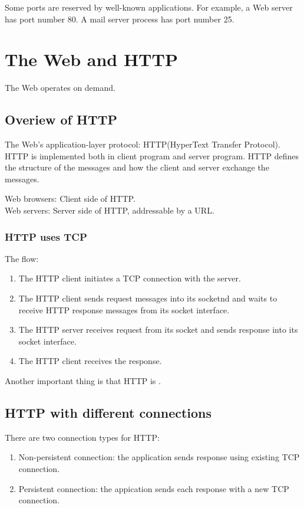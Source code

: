 Some ports are reserved by well-known applications. For example, a Web server has port number 80. A mail server process has port number 25.



\section{The Web and HTTP}
The Web operates on demand.
\subsection{Overiew of HTTP}

The Web's application-layer protocol: HTTP(HyperText Transfer Protocol). HTTP is implemented both in client program and server program.
HTTP defines the structure of the messages and how the client and server exchange the messages.\\
\begin{center}
    Web browsers: Client side of HTTP.\\
    Web servers: Server side of HTTP, addressable by a URL.
\end{center}


\subsubsection{HTTP uses TCP}
The flow:
\begin{enumerate}
    \item The HTTP client initiates a TCP connection with the server.
    \item The HTTP client sends request messages into its socketnd and waits to receive HTTP response messages from its socket interface.
    \item The HTTP server receives request from its socket and sends response into its socket interface.
    \item The HTTP client receives the response.
\end{enumerate}

Another important thing is that HTTP is .


\subsection{HTTP with different connections}
There are two connection types for HTTP:
\begin{enumerate}
    \item Non-persistent connection: the application sends response using existing TCP connection.
    \item Persistent connection: the appication sends each response with a new TCP connection.
\end{enumerate}

